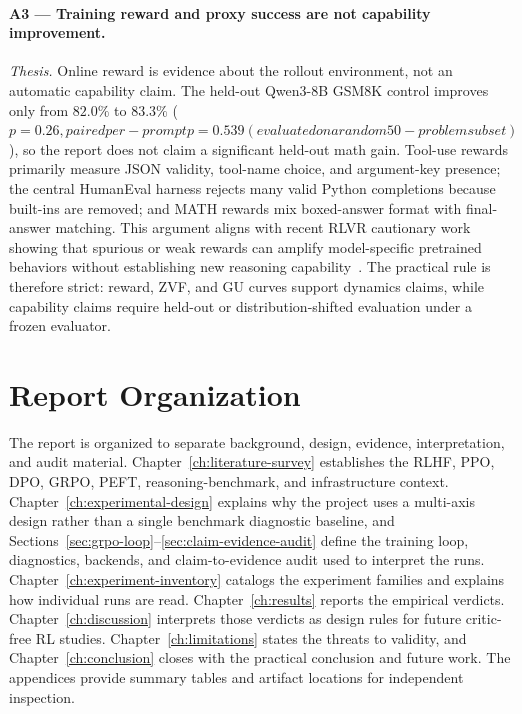 \documentclass[12pt,a4paper]{report}
\begin{document}
\paragraph{A3 --- Training reward and proxy success are not capability improvement.}
\emph{Thesis.} Online reward is evidence about the rollout environment, not an automatic capability claim. The held-out Qwen3-8B GSM8K control improves only from $82.0\%$ to $83.3\%$ ($p=0.26, paired per-prompt p=0.539 (evaluated on a random 50-problem subset)$), so the report does not claim a significant held-out math gain. Tool-use rewards primarily measure JSON validity, tool-name choice, and argument-key presence; the central HumanEval harness rejects many valid Python completions because built-ins are removed; and MATH rewards mix boxed-answer format with final-answer matching. This argument aligns with recent RLVR cautionary work showing that spurious or weak rewards can amplify model-specific pretrained behaviors without establishing new reasoning capability~\citep{shao2025spurious,liu2025understanding}. The practical rule is therefore strict: reward, ZVF, and GU curves support dynamics claims, while capability claims require held-out or distribution-shifted evaluation under a frozen evaluator.



\section{Report Organization}
\label{sec:report-organization}

The report is organized to separate background, design, evidence, interpretation, and audit material. Chapter~\ref{ch:literature-survey} establishes the RLHF, PPO, DPO, GRPO, PEFT, reasoning-benchmark, and infrastructure context. Chapter~\ref{ch:experimental-design} explains why the project uses a multi-axis design rather than a single benchmark diagnostic baseline, and Sections~\ref{sec:grpo-loop}--\ref{sec:claim-evidence-audit} define the training loop, diagnostics, backends, and claim-to-evidence audit used to interpret the runs. Chapter~\ref{ch:experiment-inventory} catalogs the experiment families and explains how individual runs are read. Chapter~\ref{ch:results} reports the empirical verdicts. Chapter~\ref{ch:discussion} interprets those verdicts as design rules for future critic-free RL studies. Chapter~\ref{ch:limitations} states the threats to validity, and Chapter~\ref{ch:conclusion} closes with the practical conclusion and future work. The appendices provide summary tables and artifact locations for independent inspection.
\end{document}
